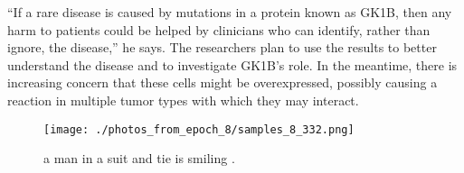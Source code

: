\documentclass{article}%
\begin{document}
“If a rare disease is caused by mutations in a protein known as GK1B, then any harm to patients could be helped by clinicians who can identify, rather than ignore, the disease,” he says.\newline%
The researchers plan to use the results to better understand the disease and to investigate GK1B’s role. In the meantime, there is increasing concern that these cells might be overexpressed, possibly causing a reaction in multiple tumor types with which they may interact.\newline%

%


\begin{figure}[h!]%
\centering%
\texttt{[image: ./photos\_from\_epoch\_8/samples\_8\_332.png]}%
\caption{a man in a suit and tie is smiling .}%
\end{figure}

%
\end{document}
